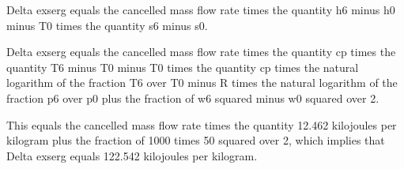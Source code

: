 Delta exserg equals the cancelled mass flow rate times the quantity h6 minus h0 minus T0 times the quantity s6 minus s0.

Delta exserg equals the cancelled mass flow rate times the quantity cp times the quantity T6 minus T0 minus T0 times the quantity cp times the natural logarithm of the fraction T6 over T0 minus R times the natural logarithm of the fraction p6 over p0 plus the fraction of w6 squared minus w0 squared over 2.

This equals the cancelled mass flow rate times the quantity 12.462 kilojoules per kilogram plus the fraction of 1000 times 50 squared over 2, which implies that Delta exserg equals 122.542 kilojoules per kilogram.